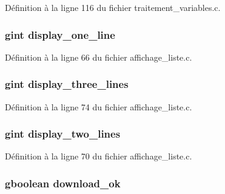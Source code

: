 Définition à la ligne 116 du fichier traitement\_\-variables.c.

\subsubsection[{display\_\-one\_\-line}]{\setlength{\rightskip}{0pt plus 5cm}gint {\bf display\_\-one\_\-line}}\label{gsb__file__load_8c_a36eb372c7727c89f6ed96a3756a28740}


Définition à la ligne 66 du fichier affichage\_\-liste.c.

\subsubsection[{display\_\-three\_\-lines}]{\setlength{\rightskip}{0pt plus 5cm}gint {\bf display\_\-three\_\-lines}}\label{gsb__file__load_8c_aa74165188c76a0e2ba64239b2236841c}


Définition à la ligne 74 du fichier affichage\_\-liste.c.

\subsubsection[{display\_\-two\_\-lines}]{\setlength{\rightskip}{0pt plus 5cm}gint {\bf display\_\-two\_\-lines}}\label{gsb__file__load_8c_a420ccd553ba703004c7415ba8ee25630}


Définition à la ligne 70 du fichier affichage\_\-liste.c.

\subsubsection[{download\_\-ok}]{\setlength{\rightskip}{0pt plus 5cm}gboolean {\bf download\_\-ok}}\label{gsb__file__load_8c_ab7b43328293e5cd584113802bdf6ec5a}


